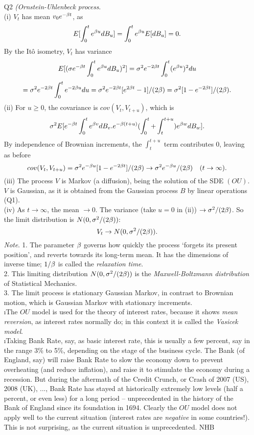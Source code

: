 \documentclass[12pt]{article}
\begin{document}
\ni Q2 {\it (Ornstein-Uhlenbeck process}.  \\
(i) $V_t$ has mean $v_0 e^{-\beta t}$, as
$$
E[ \int_0^t e^{\beta u} dB_u] = \int_0^t e^{\beta u} E[dB_u] = 0.
$$
By the It\^o isometry, $V_t$ has variance
$$
E[(\sigma e^{-\beta t} \int_0^t e^{\beta u} dB_u)^2] = {\sigma}^2 e^{-2 \beta t} \int_0^t (e^{\beta u})^2 du
$$
$$
= {\sigma}^2 e^{-2 \beta t} \int_0^t e^{-2 \beta u} du = {\sigma}^2 e^{-2 \beta t} [e^{2 \beta t} - 1]/(2 \beta) = {\sigma}^2 [1 - e^{-2 \beta t}]/(2 \beta).
$$
(ii) For $u \geq 0$, the covariance is $cov(V_t, V_{t+u})$, which is
$$
{\sigma}^2 E[e^{-\beta t} \int_0^t e^{\beta v} dB_v.e^{-\beta (t + u)} (\int_0^t + \int_t^{t+u}) e^{\beta w} dB_w].
$$
By independence of Brownian increments, the $\int_t^{t+u}$ term contributes 0, leaving as before
$$
cov(V_t, V_{t+u}) = {\sigma}^2 e^{-\beta u} [1 - e^{-2 \beta t}]/(2 \beta) \to {\sigma}^2 e^{-\beta u}/(2 \beta) \quad (t \to \infty).
$$
(iii)  The process $V$ is Markov (a diffusion), being the solution of the SDE $(OU)$.  $V$ is Gaussian, as it is obtained from the Gaussian process $B$ by linear operations (Q1). \\
(iv)  As $t \to \infty$, the mean $\to 0$.  The variance (take $u = 0$ in (ii)) $\to {\sigma}^2/(2 \beta)$.  So the limit distribution is $N(0,{\sigma}^2/(2 \beta))$:
$$
V_t \to N(0,{\sigma}^2/(2 \beta)).
$$
{\it Note}. 1.  The parameter $\beta$ governs how quickly the process `forgets its present position', and reverts towards its long-term mean.  It has the dimensions of inverse time;
$1/\beta$ is called the {\it relaxation time}.\\
2. This limiting distribution $N(0, {\sigma}^2/(2 \beta))$ is the {\it Maxwell-Boltzmann distribution} of Statistical Mechanics.  \\
3. The limit process is stationary Gaussian Markov, in contrast to Brownian motion, which is Gaussian Markov with stationary increments. \\

\i The $OU$ model is used for the theory of interest rates, because it shows {\it mean reversion}, as interest rates normally do; in this context it is called the {\it Vasicek model}. \\
\i Taking Bank Rate, say, as basic interest rate, this is usually a few percent, say in the range 3\% to 5\%, depending on the stage of the business cycle.  The Bank (of England, say) will
raise Bank Rate to slow the economy down to prevent overheating (and reduce inflation), and raise it to stimulate the economy during a recession.  But during the aftermath of the Credit Crunch,
or Crash of 2007 (US), 2008 (UK), ..., Bank Rate has stayed at historically extremely low levels (half a percent, or even less) for a long period -- unprecedented in the history of the Bank of England since its foundation in 1694.  Clearly the $OU$ model does not apply well to the current situation (interest rates are {\it negative} in some countries!).  This is not surprising, as the current situation is unprecedented.  \hfil NHB \break
\end{document}
